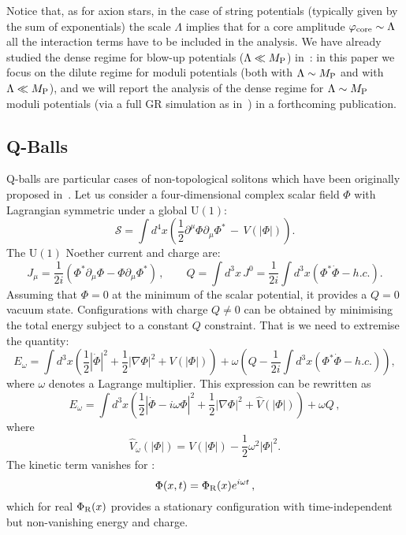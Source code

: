 \documentclass[11pt,a4paper]{article}
\newcommand{\be}{\begin{equation}}
\newcommand{\ee}{\end{equation}}
\begin{document}
Notice that, as for axion stars, in the case of string potentials (typically given by the sum of exponentials) the scale $\Lambda$ implies that for a core amplitude $\varphi_{\rm core} \sim \Lambda$ all the interaction terms have to be included in the analysis. We have already studied the dense regime for blow-up potentials ($\Lambda \ll M_{\rm P}$) in~\cite{Antusch:2017flz}: in this paper we focus on the dilute regime for moduli potentials (both with $\Lambda \sim M_{\rm P}$ and with $\Lambda \ll M_{\rm P}$), and we will report the analysis of the dense regime for $\Lambda \sim M_{\rm P}$ moduli potentials (via a full GR simulation as in~\cite{Helfer:2016ljl}) in a forthcoming publication.

\subsection{Q-Balls}
\label{sec:QBalls}

Q-balls are particular cases of non-topological solitons which have been originally proposed in~\cite{Coleman:1985ki}. Let us consider a four-dimensional complex scalar field $\Phi$ with Lagrangian symmetric under a global U$(1)$:
 \be
 \mathcal{S}= \int d^4 x \left(\frac{1}{2} \partial^\mu \Phi \partial_\mu \Phi^* \, -\, V(|\Phi|)\right).
 \ee 
 The U$(1)$ Noether current and charge are:
 \be
 J_\mu = \frac{1}{2i}\left( \Phi^*\partial_\mu \Phi-\Phi\partial_\mu\Phi^*\right) \,, \qquad Q=\int d^3 x\, J^0=\frac{1}{2i}\int d^3 x\left(\Phi^*\dot{\Phi}-h.c.\right).
 \ee
 Assuming that $\Phi=0$ at the minimum of the scalar potential, it provides a $Q=0$ vacuum state. Configurations with charge $Q\neq 0$ can be obtained by minimising the total energy subject to a constant $Q$ constraint. That is we need to extremise the quantity:
 \be
 E_\omega=\int d^3 x \left(\frac{1}{2}|\dot{\Phi}|^2+\frac{1}{2}|\nabla\Phi|^2+ V(|\Phi|) \right)+\omega\left(Q-\frac{1}{2i}\int d^3 x\left(\Phi^*\dot{\Phi}-h.c.\right)\right),
 \ee
  where $\omega$ denotes a Lagrange multiplier. This expression can be rewritten as 
  \be
 E_\omega=\int d^3 x \left(\frac{1}{2}|\dot{\Phi}-i\omega \Phi |^2+\frac{1}{2}|\nabla\Phi|^2+ \hat{V}(|\Phi|) \right)+\omega Q \,,
  \ee
where 
\be
\hat{V}_\omega(|\Phi|)=V(|\Phi|)-\frac{1}{2}\omega^2 |\Phi|^2.
\ee
The kinetic term vanishes for :
\be
\Phi(x,t)=\Phi_{\rm R}(x) e^{i\omega t} \,,
\ee
which for real $\Phi_{\rm R}(x)$ provides a stationary configuration with time-independent but non-vanishing energy and charge. 
\end{document}
